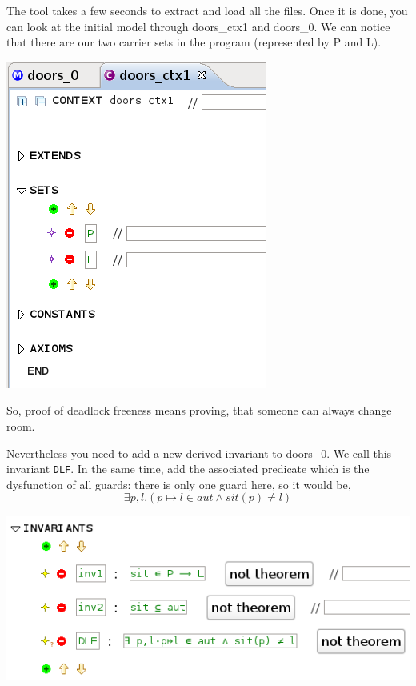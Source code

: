 The tool takes a few seconds to extract and load all the files. Once it is done, you can look at the initial model through doors\_ctx1 and doors\_0.
We can notice that there are our two carrier sets in the program (represented by P and L).
\begin{center}
	\includegraphics[]{img/tutorial/tut_10_carrier-sets.png}
\end{center}

So, proof of deadlock freeness means proving, that someone can always change room.

Nevertheless you need to add a new derived invariant to doors\_0. We call this invariant \texttt{DLF}.
In the same time, add the associated predicate which is the dysfunction of all guards: there is only one guard here, so it would be,
\[
\exists p,l.(p \longmapsto l \in aut \land sit(p) \neq l )
\]



\begin{center}
	\includegraphics[]{img/tutorial/tut_10_new-invariant.png}
\end{center}


